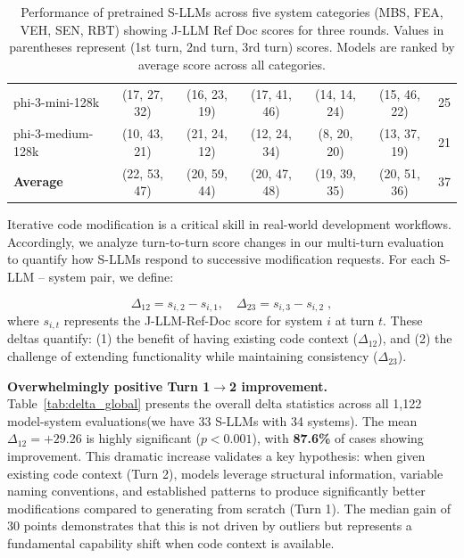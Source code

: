 \begin{table}[htbp]
{\begin{tabular}{lcccccc}
          phi-3-mini-128k & (17, 27, 32) & (16, 23, 19) & (17, 41, 46) & (14, 14, 24) & (15, 46, 22) & 25 \\
          phi-3-medium-128k & (10, 43, 21) & (21, 24, 12) & (12, 24, 34) & (8, 20, 20) & (13, 37, 19) & 21 \\
          \midrule
          \textbf{Average} & (22, 53, 47) & (20, 59, 44) & (20, 47, 48) & (19, 39, 35) & (20, 51, 36) & 37 \\
          \bottomrule
          \end{tabular}
          }
          \caption{Performance of pretrained S-LLMs across five system categories (MBS, FEA, VEH, SEN, RBT) showing J-LLM Ref Doc scores for three rounds. Values in parentheses represent (1st turn, 2nd turn, 3rd turn) scores. Models are ranked by average score across all categories.}
          \vspace{-10pt}
          \label{tab:llm_metrics_jllm}
      \end{table}
\medskip
{}
\label{subsec:multiturn_delta}
Iterative code modification is a critical skill in real-world development workflows. Accordingly, we analyze turn-to-turn score changes in our multi-turn evaluation to quantify how S-LLMs respond to successive modification requests. For each S-LLM -- system pair, we define:

\begin{equation}
\Delta_{12} = s_{i,2} - s_{i,1}, \quad \Delta_{23} = s_{i,3} - s_{i,2} \; ,
\end{equation}
where $s_{i,t}$ represents the J-LLM-Ref-Doc score for system $i$ at turn $t$. These deltas quantify: (1) the benefit of having existing code context ($\Delta_{12}$), and (2) the challenge of extending functionality while maintaining consistency ($\Delta_{23}$).

\textbf{Overwhelmingly positive Turn 1$\to$2 improvement.}
Table~\ref{tab:delta_global} presents the overall delta statistics across all 1,122 model-system evaluations(we have 33 S-LLMs with 34 systems). The mean $\Delta_{12} = +29.26$ is highly significant ($p < 0.001$), with \textbf{87.6\%} of cases showing improvement. This dramatic increase validates a key hypothesis: when given existing code context (Turn 2), models leverage structural information, variable naming conventions, and established patterns to produce significantly better modifications compared to generating from scratch (Turn 1). The median gain of 30 points demonstrates that this is not driven by outliers but represents a fundamental capability shift when code context is available.

